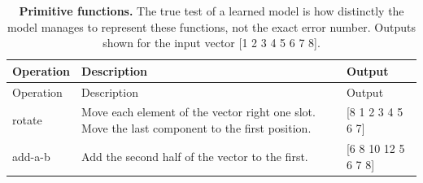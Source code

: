 \documentclass[12pt,twoside]{mitthesis}
\begin{document}
\begin{longtable}[c]{@{}lll@{}}
\caption{\label{tbl:primitives}\textbf{Primitive functions.} The true
test of a learned model is how distinctly the model manages to represent
these functions, not the exact error number. Outputs shown for the input
vector {[}1 2 3 4 5 6 7 8{]}. }\tabularnewline
\toprule
\begin{minipage}[b]{0.14\columnwidth}\raggedright\strut
Operation
\strut\end{minipage} &
\begin{minipage}[b]{0.55\columnwidth}\raggedright\strut
Description
\strut\end{minipage} &
\begin{minipage}[b]{0.22\columnwidth}\raggedright\strut
Output
\strut\end{minipage}\tabularnewline
\midrule
\endfirsthead
\toprule
\begin{minipage}[b]{0.14\columnwidth}\raggedright\strut
Operation
\strut\end{minipage} &
\begin{minipage}[b]{0.55\columnwidth}\raggedright\strut
Description
\strut\end{minipage} &
\begin{minipage}[b]{0.22\columnwidth}\raggedright\strut
Output
\strut\end{minipage}\tabularnewline
\midrule
\endhead
\begin{minipage}[t]{0.14\columnwidth}\raggedright\strut
rotate
\strut\end{minipage} &
\begin{minipage}[t]{0.55\columnwidth}\raggedright\strut
Move each element of the vector right one slot. Move the last component
to the first position.
\strut\end{minipage} &
\begin{minipage}[t]{0.22\columnwidth}\raggedright\strut
{[}8 1 2 3 4 5 6 7{]}
\strut\end{minipage}\tabularnewline
\begin{minipage}[t]{0.14\columnwidth}\raggedright\strut
add-a-b
\strut\end{minipage} &
\begin{minipage}[t]{0.55\columnwidth}\raggedright\strut
Add the second half of the vector to the first.
\strut\end{minipage} &
\begin{minipage}[t]{0.22\columnwidth}\raggedright\strut
{[}6 8 10 12 5 6 7 8{]}
\strut\end{minipage}\tabularnewline

\end{longtable}
\end{document}
